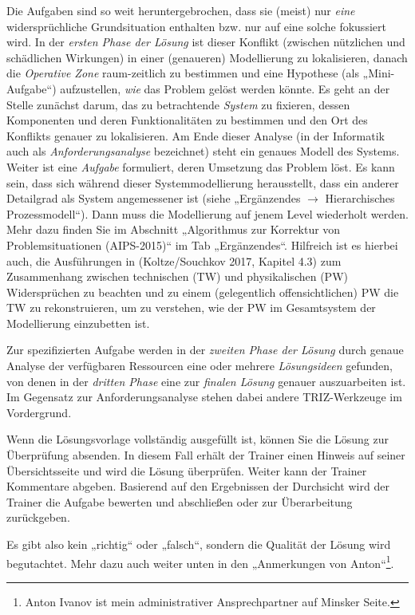 \documentclass[11pt,a4paper]{article}
\begin{document}
Die Aufgaben sind so weit heruntergebrochen, dass sie (meist) nur \emph{eine}
widersprüchliche Grundsituation enthalten bzw. nur auf eine solche fokussiert
wird.  In der \emph{ersten Phase der Lösung} ist dieser Konflikt (zwischen
nützlichen und schädlichen Wirkungen) in einer (genaueren) Modellierung zu
lokalisieren, danach die \emph{Operative Zone} raum-zeitlich zu bestimmen und
eine Hypothese (als „Mini-Aufgabe“) aufzustellen, \emph{wie} das Problem
gelöst werden könnte. Es geht an der Stelle zunächst darum, das zu
betrachtende \emph{System} zu fixieren, dessen Komponenten und deren
Funktionalitäten zu bestimmen und den Ort des Konflikts genauer zu
lokalisieren.  Am Ende dieser Analyse (in der Informatik auch als
\emph{Anforderungsanalyse} bezeichnet) steht ein genaues Modell des Systems.
Weiter ist eine \emph{Aufgabe} formuliert, deren Umsetzung das Problem löst.
Es kann sein, dass sich während dieser Systemmodellierung herausstellt, dass
ein anderer Detailgrad als System angemessener ist (siehe „Ergänzendes $\to$
Hierarchisches Prozessmodell“).  Dann muss die Modellierung auf jenem Level
wiederholt werden. Mehr dazu finden Sie im Abschnitt „Algorithmus zur
Korrektur von Problemsituationen (AIPS-2015)“ im Tab „Ergänzendes“.  Hilfreich
ist es hierbei auch, die Ausführungen in (Koltze/Souchkov 2017, Kapitel 4.3)
zum Zusammenhang zwischen technischen (TW) und physikalischen (PW)
Widersprüchen zu beachten und zu einem (gelegentlich offensichtlichen) PW die
TW zu rekonstruieren, um zu verstehen, wie der PW im Gesamtsystem der
Modellierung einzubetten ist.

Zur spezifizierten Aufgabe werden in der \emph{zweiten Phase der Lösung} durch
genaue Analyse der verfügbaren Ressourcen eine oder mehrere
\emph{Lösungsideen} gefunden, von denen in der \emph{dritten Phase} eine zur
\emph{finalen Lösung} genauer auszuarbeiten ist.  Im Gegensatz zur
Anforderungsanalyse stehen dabei andere TRIZ-Werkzeuge im Vordergrund.

Wenn die Lösungsvorlage vollständig ausgefüllt ist, können Sie die Lösung zur
Überprüfung absenden. In diesem Fall erhält der Trainer einen Hinweis auf
seiner Übersichtsseite und wird die Lösung überprüfen.  Weiter kann der
Trainer Kommentare abgeben. Basierend auf den Ergebnissen der Durchsicht wird
der Trainer die Aufgabe bewerten und abschließen oder zur Überarbeitung
zurückgeben.

Es gibt also kein „richtig“ oder „falsch“, sondern die Qualität der Lösung
wird begutachtet. Mehr dazu auch weiter unten in den „Anmerkungen von
Anton“\footnote{Anton Ivanov ist mein administrativer Ansprechpartner auf
  Minsker Seite.}.
\end{document}

